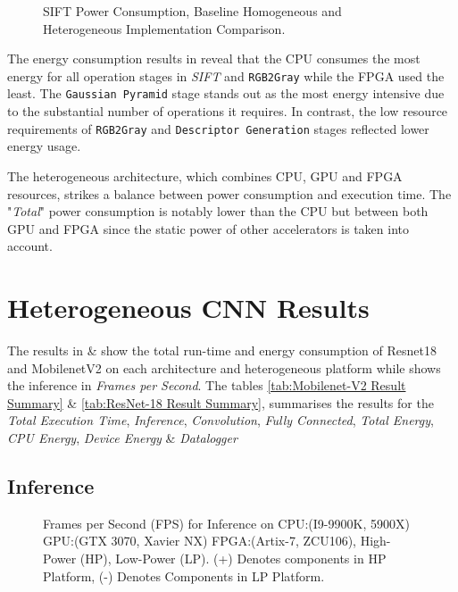 \begin{figure}[tb]
    \centering
\resizebox{\linewidth}{!}{}    %
    \caption[SIFT Power Consumption]{SIFT Power Consumption, Baseline Homogeneous and Heterogeneous Implementation Comparison.}
    \label{fig:SIFTPower}
\end{figure}

The energy consumption results in  reveal that the CPU consumes the most energy for all operation stages in \textit{SIFT} and \texttt{RGB2Gray} while the FPGA used the least. The \texttt{Gaussian Pyramid} stage stands out as the most energy intensive due to the substantial number of operations it requires. In contrast, the low resource requirements of \texttt{RGB2Gray} and \texttt{Descriptor Generation} stages reflected lower energy usage.

The heterogeneous architecture, which combines CPU, GPU and FPGA resources, strikes a balance between power consumption and execution time. The "\textit{Total}" power consumption is notably lower than the CPU but between both GPU and FPGA since the static power of other accelerators is taken into account.



\section{Heterogeneous CNN Results}
The results in  \&  show the total run-time and energy consumption of  Resnet18 and MobilenetV2 on each architecture and heterogeneous platform while  shows the inference in \textit{Frames per Second}. The tables \ref{tab:Mobilenet-V2 Result Summary} \& \ref{tab:ResNet-18 Result Summary}, summarises the results for the \textit{Total Execution Time}, \textit{Inference}, \textit{Convolution}, \textit{Fully Connected}, \textit{Total Energy}, \textit{CPU Energy}, \textit{Device Energy} \& \textit{Datalogger}



\subsection{Inference}
\begin{figure}[t]
    \centering
\resizebox{\linewidth}{!}{}    %
    \caption[Frames per Second (FPS) for Inference]{Frames per Second (FPS) for Inference on CPU:(I9-9900K, 5900X) GPU:(GTX 3070, Xavier NX) FPGA:(Artix-7, ZCU106), High-Power (HP), Low-Power (LP). (+) Denotes components in HP Platform, (-) Denotes Components in LP Platform.}
    \label{fig:InferenceFPS}
\end{figure}

